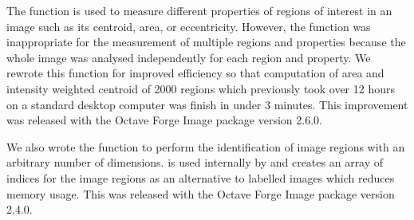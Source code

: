 The function  is used to measure different
properties of regions of interest in an image such as its centroid,
area, or eccentricity.  However, the function was inappropriate for
the measurement of multiple regions and properties because the whole
image was analysed independently for each region and property.  We rewrote
this function for improved efficiency so that
computation of area and intensity weighted
centroid of 2000 regions which previously took over 12 hours on a
standard desktop computer was finish in under 3 minutes.
This improvement was released with the Octave Forge Image package version 2.6.0.

We also wrote the function  to perform the
identification of image regions with an arbitrary number of
dimensions.
 is used internally by  and
creates an array of indices for the image regions as an
alternative to labelled images which reduces memory usage.
This was released with the Octave Forge Image
package version 2.4.0.


